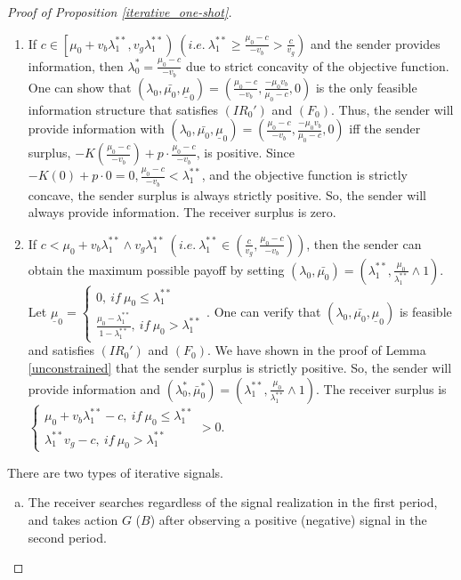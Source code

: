 \documentclass[11pt]{extarticle}
\newcommand{\m}{\wedge}
\begin{document}
\begin{proof}[Proof of Proposition \ref{iterative_one-shot}]
\begin{enumerate}
		\item If $c \in \left[\mu_0 + v_b\lambda_1^{**},v_g\lambda_1^{**} \right)~(i.e.~ \lambda_1^{**} \geq \frac{\mu_0-c}{-v_b} > \frac{c}{v_g})$ and the sender provides information, then $\lambda_0^* = \frac{\mu_0-c}{-v_b}$ due to strict concavity of the objective function. One can show that $(\lambda_0,\bar{\mu_0},\underline{\mu}_0) = (\frac{\mu_0-c}{-v_b},\frac{-\mu_0 v_b}{\mu_0-c},0)$ is the only feasible information structure that satisfies $(IR_0')$ and $(F_0)$. Thus, the sender will provide information with $(\lambda_0,\bar{\mu_0},\underline{\mu}_0) = (\frac{\mu_0-c}{-v_b},\frac{-\mu_0 v_b}{\mu_0-c},0)$ iff the sender surplus, $-K(\frac{\mu_0-c}{-v_b})+p\cdot \frac{\mu_0-c}{-v_b}$, is positive. Since $-K(0)+p\cdot 0 = 0, \frac{\mu_0-c}{-v_b} < \lambda_1^{**}$, and the objective function is strictly concave, the sender surplus is always strictly positive. So, the sender will always provide information. The receiver surplus is zero.
		
		\item If $c < \mu_0 + v_b\lambda_1^{**} \m v_g \lambda_1^{**} ~(i.e.~ \lambda_1^{**} \in \left(\frac{c}{v_g}, \frac{\mu_0-c}{-v_b}\right))$, then the sender can obtain the maximum possible payoff by setting $(\lambda_0,\bar{\mu_0}) = (\lambda_1^{**},\frac{\mu_0}{\lambda_1^{**}}\m 1)$. Let $\underline{\mu}_0 = 
		\begin{cases}
		0 ,~if~\mu_0 \leq \lambda_1^{**}\\
		\frac{\mu_0-\lambda_1^{**}}{1-\lambda_1^{**}},~if~\mu_0 > \lambda_1^{**}
		\end{cases}$. One can verify that $(\lambda_0,\bar{\mu_0},\underline{\mu}_0)$ is feasible and satisfies $(IR_0')$ and $(F_0)$. We have shown in the proof of Lemma \ref{unconstrained} that the sender surplus is strictly positive. So, the sender will provide information and $(\lambda^*_0,\bar{\mu}_0^*) = (\lambda_1^{**},\frac{\mu_0}{\lambda_1^{**}}\m 1)$. The receiver surplus is $\begin{cases}
		\mu_0 + v_b\lambda_1^{**} - c,~if~\mu_0 \leq \lambda_1^{**} \\
		\lambda_1^{**}v_g - c,~if~\mu_0 > \lambda_1^{**}
		\end{cases} > 0$.
	\end{enumerate}
	
	There are two types of iterative signals. 
	\begin{enumerate}[(a)]
		\item The receiver searches regardless of the signal realization in the first period, and takes action $G$ ($B$) after observing a positive (negative) signal in the second period.
		

\end{enumerate}
\end{proof}
\end{document}
